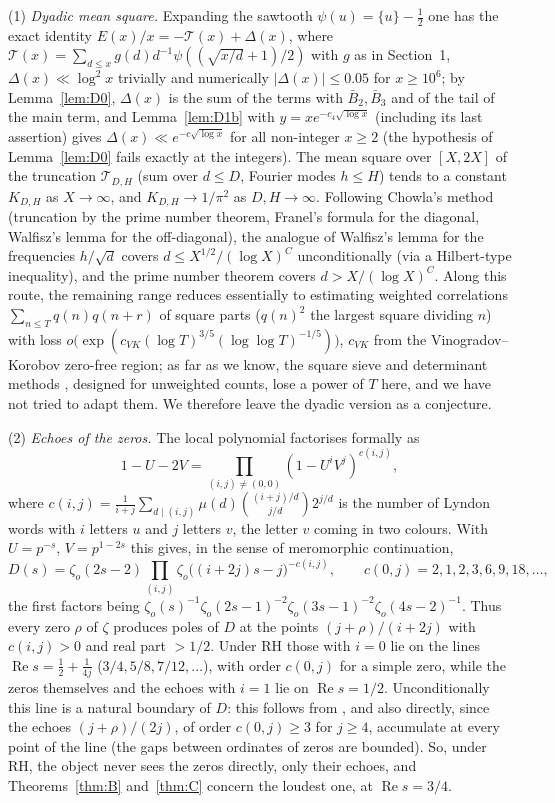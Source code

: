 \documentclass[11pt]{amsart}
\theoremstyle{remark}
\newcommand{\zo}{\zeta_{o}}
\newcommand{\cT}{\mathcal{T}}
\begin{document}
(1) \emph{Dyadic mean square.} Expanding the sawtooth $\psi(u)=\{u\}-\tfrac12$ one has the exact identity $E(x)/x=-\cT(x)+\Delta(x)$, where $\cT(x)=\sum_{d\le x}g(d)d^{-1}\psi((\sqrt{x/d}+1)/2)$ with $g$ as in Section~1, $\Delta(x)\ll\log^2x$ trivially and numerically $|\Delta(x)|\le0.05$ for $x\ge10^6$; by Lemma~\ref{lem:D0}, $\Delta(x)$ is the sum of the terms with $\bar B_2,\bar B_3$ and of the tail of the main term, and Lemma~\ref{lem:D1b} with $y=xe^{-c_4\sqrt{\log x}}$ (including its last assertion) gives $\Delta(x)\ll e^{-c\sqrt{\log x}}$ for all non-integer $x\ge2$ (the hypothesis of Lemma~\ref{lem:D0} fails exactly at the integers). The mean square over $[X,2X]$ of the truncation $\cT_{D,H}$ (sum over $d\le D$, Fourier modes $h\le H$) tends to a constant $K_{D,H}$ as $X\to\infty$, and $K_{D,H}\to1/\pi^2$ as $D,H\to\infty$. Following Chowla's method \cite{Ch} (truncation by the prime number theorem, Franel's formula for the diagonal, Walfisz's lemma \cite{W} for the off-diagonal), the analogue of Walfisz's lemma for the frequencies $h/\sqrt d$ covers $d\le X^{1/2}/(\log X)^C$ unconditionally (via a Hilbert-type inequality), and the prime number theorem covers $d>X/(\log X)^C$. Along this route, the remaining range reduces essentially to estimating weighted correlations $\sum_{n\le T}q(n)q(n+r)$ of square parts ($q(n)^2$ the largest square dividing $n$) with loss $o\big(\exp(c_{VK}(\log T)^{3/5}(\log\log T)^{-1/5})\big)$, $c_{VK}$ from the Vinogradov--Korobov zero-free region; as far as we know, the square sieve \cite{HB} and determinant methods \cite{Re}, designed for unweighted counts, lose a power of $T$ here, and we have not tried to adapt them. We therefore leave the dyadic version as a conjecture.

(2) \emph{Echoes of the zeros.} The local polynomial factorises formally as
\[
1-U-2V=\prod_{(i,j)\neq(0,0)}(1-U^iV^j)^{c(i,j)},
\]
where $c(i,j)=\frac1{i+j}\sum_{d\mid(i,j)}\mu(d)\binom{(i+j)/d}{j/d}2^{j/d}$ is the number of Lyndon words with $i$ letters $u$ and $j$ letters $v$, the letter $v$ coming in two colours. With $U=p^{-s}$, $V=p^{1-2s}$ this gives, in the sense of meromorphic continuation,
\[
D(s)=\zo(2s-2)\prod_{(i,j)}\zo\big((i+2j)s-j\big)^{-c(i,j)},\qquad c(0,j)=2,1,2,3,6,9,18,\dots,
\]
the first factors being $\zo(s)^{-1}\zo(2s-1)^{-2}\zo(3s-1)^{-2}\zo(4s-2)^{-1}$. Thus every zero $\rho$ of $\zeta$ produces poles of $D$ at the points $(j+\rho)/(i+2j)$ with $c(i,j)>0$ and real part $>1/2$. Under RH those with $i=0$ lie on the lines $\operatorname{Re}s=\frac12+\frac1{4j}$ ($3/4,5/8,7/12,\dots$), with order $c(0,j)$ for a simple zero, while the zeros themselves and the echoes with $i=1$ lie on $\operatorname{Re}s=1/2$. Unconditionally this line is a natural boundary of $D$: this follows from \cite[Thm.~1(2)]{BSP}, and also directly, since the echoes $(j+\rho)/(2j)$, of order $c(0,j)\ge3$ for $j\ge4$, accumulate at every point of the line (the gaps between ordinates of zeros are bounded). So, under RH, the object never sees the zeros directly, only their echoes, and Theorems~\ref{thm:B} and~\ref{thm:C} concern the loudest one, at $\operatorname{Re}s=3/4$.
\end{document}
